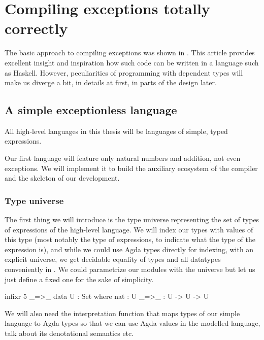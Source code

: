 \chapter{Compiling exceptions totally correctly}


The basic approach to compiling exceptions was shown in \cite{gmh:exceptions}.
This article provides excellent insight and inspiration how such code can be written
in a language such as Haskell.
However, peculiarities of programming with dependent types will make us
diverge a bit, in details at first, in parts of the design later.

\section{A simple exceptionless language}

All high-level languages in this thesis will be languages of simple, typed
expressions.

Our first language will feature only natural numbers and addition, not even
exceptions. We will implement it to build the auxiliary ecosystem of the
compiler and the skeleton of our development.


\subsection{Type universe}

The first thing we will introduce is the type universe representing the set of
types of expressions of the high-level language. We will index our types with
values of this type (most notably the type  of expressions, to
indicate what the type of the expression is), and while we could use Agda types
directly for indexing, with an explicit universe, we get decidable equality of
types and all datatypes conveniently in . We could parametrize our
modules with the universe but let us just define a fixed one for the sake of
simplicity.

\begin{code}
  infixr 5 _=>\_
  data U : Set where
    nat : U
    _=>\_ : U -> U -> U
\end{code}


\noindent We will also need the interpretation function  that maps
types of our simple language to Agda types so that we can use Agda values in
the modelled language, talk about its denotational semantics etc.


